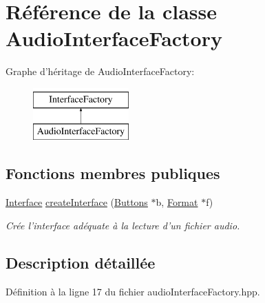 \hypertarget{classAudioInterfaceFactory}{\section{Référence de la classe Audio\+Interface\+Factory}
\label{classAudioInterfaceFactory}
}
Graphe d'héritage de Audio\+Interface\+Factory\+:\begin{figure}[H]
\begin{center}
\leavevmode
\includegraphics[height=2.000000cm]{classAudioInterfaceFactory}
\end{center}
\end{figure}
\subsection*{Fonctions membres publiques}
\begin{DoxyCompactItemize}
\item 
\hyperlink{classInterface}{Interface} \hyperlink{classAudioInterfaceFactory_ad5367033861d4aadd1ad0b0f5fa1caeb}{create\+Interface} (\hyperlink{classButtons}{Buttons} $\ast$b, \hyperlink{classFormat}{Format} $\ast$f)
\begin{DoxyCompactList}\small\item\em Crée l'interface adéquate à la lecture d'un fichier audio. \end{DoxyCompactList}\end{DoxyCompactItemize}


\subsection{Description détaillée}


Définition à la ligne 17 du fichier audio\+Interface\+Factory.\+hpp.



